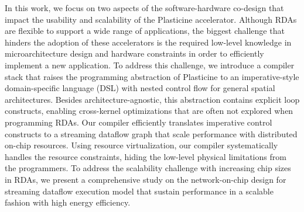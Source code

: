 In this work, we focus on two aspects of the software-hardware co-design that impact the usability
and scalability of the Plasticine accelerator. 
Although RDAs are flexible to support a wide range of applications, 
the biggest challenge that hinders the adoption of these accelerators is 
the required low-level knowledge in microarchitecture design and hardware constraints in
order to efficiently implement a new application.
To address this challenge, we introduce a compiler stack that raises the programming abstraction of
Plasticine to an imperative-style domain-specific language (DSL) with nested control
flow for general spatial architectures.
Besides architecture-agnostic, this abstraction contains explicit loop constructs, enabling cross-kernel optimizations that are often not explored when programming RDAs.
Our compiler efficiently translates imperative control constructs to a streaming
dataflow graph that scale performance with distributed on-chip resources.
Using resource virtualization, our compiler systematically handles the resource constraints, hiding
the low-level physical limitations from the programmers.
To address the scalability challenge with increasing chip sizes in RDAs, 
we present a comprehensive study on the network-on-chip design 
for streaming dataflow execution model that sustain performance in a 
scalable fashion with high energy efficiency.
